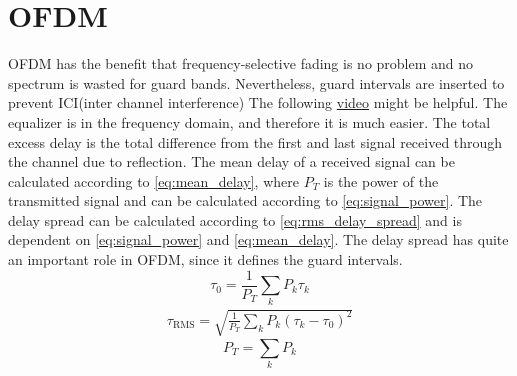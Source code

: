 \section{OFDM}
OFDM has the benefit that frequency-selective fading is no problem and no spectrum is wasted for guard bands. Nevertheless, guard intervals are inserted to prevent ICI(inter channel interference) The following \href{https://youtu.be/i3LBGw8Yle4}{video} might be helpful.
The equalizer is in the frequency domain, and therefore it is much easier.\newline
The total excess delay is the total difference from the first and last signal received through the channel due to reflection. The mean delay of a received signal can be calculated according to \autoref{eq:mean_delay}, where $P_T$ is the power of the transmitted signal and can be calculated according to \autoref{eq:signal_power}. The delay spread can be calculated according to \autoref{eq:rms_delay_spread} and is dependent on \autoref{eq:signal_power} and \autoref{eq:mean_delay}. The delay spread has quite an important role in OFDM, since it defines the guard intervals.
\begin{equation}\label{eq:mean_delay}
\tau_0=\frac{1}{P_T} \sum_k P_k \tau_k
\end{equation}
\begin{equation}\label{eq:rms_delay_spread}
\begin{aligned}
\tau_{\mathrm{RMS}} =\sqrt{\frac{1}{P_T} \sum_k P_k\left(\tau_k-\tau_0\right)^2}
\end{aligned}
\end{equation}
\begin{equation}\label{eq:signal_power}
P_T =\sum_k P_k
\end{equation}

